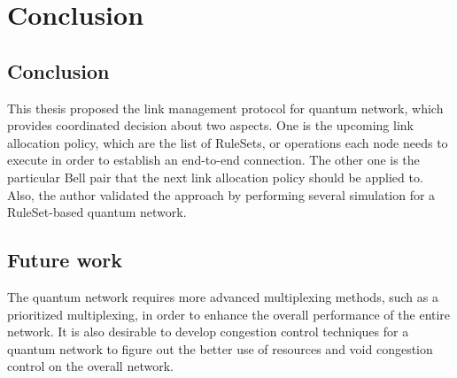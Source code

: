 \chapter{Conclusion}
\label{conclusion}

\section{Conclusion}

This thesis proposed the link management protocol for quantum network, which provides coordinated decision about two aspects.
One is the upcoming link allocation policy, which are the list of RuleSets, or operations each node needs to execute in order to establish an end-to-end connection.
The other one is the particular Bell pair that the next link allocation policy should be applied to.
Also, the author validated the approach by performing several simulation for a RuleSet-based quantum network.

\section{Future work}

The quantum network requires more advanced multiplexing methods, such as a prioritized multiplexing, in order to enhance the overall performance of the entire network.
It is also desirable to develop congestion control techniques for a quantum network to figure out the better use of resources and void congestion control on the overall network.

